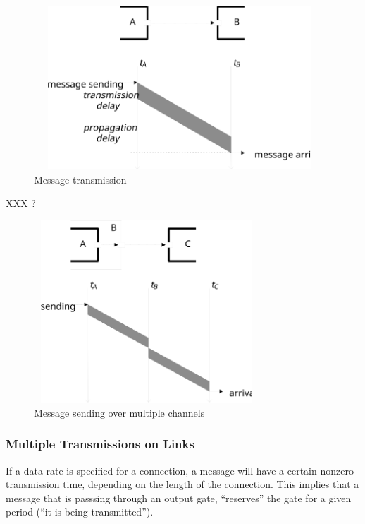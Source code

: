 \begin{figure}[htbp]
\begin{center}
\includegraphics[width=4.301in, height=2.417in]{figures/simple-transmission}
\caption{Message transmission}
\label{fig:ch-overview:message-transm}
\end{center}
\end{figure}

XXX ?

\begin{figure}[htbp]
\begin{center}
\includegraphics[width=3.330in, height=2.692in]{figures/simple-messagesend}
\caption{Message sending over multiple channels}
\label{fig:ch-overview:msg-multiple-ch}
\end{center}
\end{figure}


\subsubsection{Multiple Transmissions on Links}

If a data rate is specified for a connection, a message
will have a certain nonzero transmission time, depending on the length of the connection. This implies that
a message that is passsing through an output gate, ``reserves'' the gate
for a given period (``it is being transmitted'').

